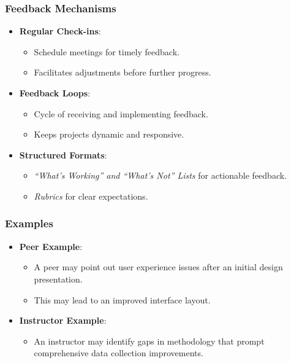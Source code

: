 \documentclass[aspectratio=169]{beamer}
\begin{document}
\begin{frame}[fragile]
    \frametitle{Feedback Mechanisms}
    \begin{itemize}
        \item \textbf{Regular Check-ins}:
            \begin{itemize}
                \item Schedule meetings for timely feedback.
                \item Facilitates adjustments before further progress.
            \end{itemize}
        \item \textbf{Feedback Loops}:
            \begin{itemize}
                \item Cycle of receiving and implementing feedback.
                \item Keeps projects dynamic and responsive.
            \end{itemize}
        \item \textbf{Structured Formats}:
            \begin{itemize}
                \item \textit{“What’s Working” and “What’s Not” Lists} for actionable feedback.
                \item \textit{Rubrics} for clear expectations.
            \end{itemize}
    \end{itemize}
\end{frame}

\begin{frame}[fragile]
    \frametitle{Examples}
    \begin{itemize}
        \item \textbf{Peer Example}:
            \begin{itemize}
                \item A peer may point out user experience issues after an initial design presentation.
                \item This may lead to an improved interface layout.
            \end{itemize}
        \item \textbf{Instructor Example}:
            \begin{itemize}
                \item An instructor may identify gaps in methodology that prompt comprehensive data collection improvements.
            \end{itemize}
    \end{itemize}
\end{frame}
\end{document}
